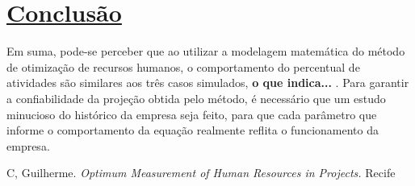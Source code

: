 \documentclass[14pt, oneside]{book}
\theoremstyle{definition}
\begin{document}
            \chapter[Conclusão]{\hyperlink{toc}{Conclusão}}
            Em suma, pode-se perceber que ao utilizar a modelagem matemática do método de otimização de recursos humanos, o comportamento do percentual de atividades são similares aos três casos simulados, \textbf{o que indica...}  .
            Para garantir a confiabilidade da projeção obtida pelo método, é necessário que um estudo minucioso do histórico da empresa seja feito, para que cada parâmetro que informe o comportamento da equação realmente reflita o funcionamento da empresa.
            
            
           
        
        \begin{thebibliography}{9}
                C, Guilherme. 
            \textit{Optimum Measurement of Human Resources in Projects.}
                Recife
        
        \end{thebibliography}


	        
\end{document}
